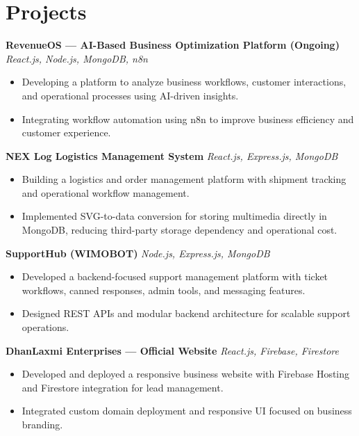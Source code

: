 \documentclass[a4paper,10pt]{article}
\begin{document}
\section*{Projects}

\textbf{RevenueOS — AI-Based Business Optimization Platform (Ongoing)}
\hfill \textit{React.js, Node.js, MongoDB, n8n}

\begin{itemize}
    \item Developing a platform to analyze business workflows, customer interactions, and operational processes using AI-driven insights.
    \item Integrating workflow automation using n8n to improve business efficiency and customer experience.
\end{itemize}

\vspace{-2pt}

\textbf{NEX Log Logistics Management System}
\hfill \textit{React.js, Express.js, MongoDB}

\begin{itemize}
    \item Building a logistics and order management platform with shipment tracking and operational workflow management.
    \item Implemented SVG-to-data conversion for storing multimedia directly in MongoDB, reducing third-party storage dependency and operational cost.
\end{itemize}

\vspace{-2pt}

\textbf{SupportHub (WIMOBOT)}
\hfill \textit{Node.js, Express.js, MongoDB}

\begin{itemize}
    \item Developed a backend-focused support management platform with ticket workflows, canned responses, admin tools, and messaging features.
    \item Designed REST APIs and modular backend architecture for scalable support operations.
\end{itemize}

\vspace{-2pt}

\textbf{DhanLaxmi Enterprises — Official Website}
\hfill \textit{React.js, Firebase, Firestore}

\begin{itemize}
    \item Developed and deployed a responsive business website with Firebase Hosting and Firestore integration for lead management.
    \item Integrated custom domain deployment and responsive UI focused on business branding.
\end{itemize}
\end{document}
